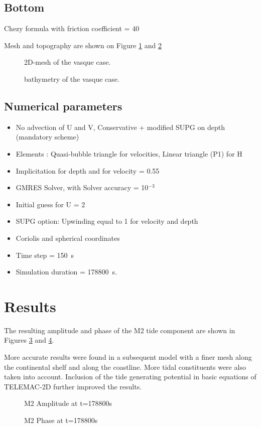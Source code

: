 \subsection{Bottom}
Chezy formula with friction coefficient = 40

Mesh and topography are shown on Figure \ref{fig:m2wave:Mesh} and \ref{fig:m2wave:Bathy}

\begin{figure}[H]
 \centering
  \caption{2D-mesh of the vasque case.}\label{fig:m2wave:Mesh}
\end{figure}
\begin{figure}[H]
 \centering
  \caption{bathymetry of the vasque case.}\label{fig:m2wave:Bathy}
\end{figure}

\subsection{Numerical parameters}
\begin{itemize}
\item No advection of U and V, Conservative + modified SUPG on depth (mandatory scheme)
\item Elements : Quasi-bubble triangle for velocities, Linear triangle (P1) for H
\item Implicitation for depth and for velocity = 0.55
\item GMRES Solver, with  Solver accuracy = 10$^{-3}$
\item  Initial guess for U = 2
\item  SUPG option: Upwinding equal to 1 for velocity and depth
\item Coriolis and spherical coordinates
\item Time step = 150~s
\item Simulation duration = 178800~s.
\end{itemize}

\section{Results}
The resulting amplitude and phase of the M2 tide component are shown in Figures \ref{fig:m2wave:Ampli} and \ref{fig:m2wave:Phase}. 

More accurate results were found in a subsequent model with a finer mesh along the
continental shelf and along the coastline. More tidal constituents were also taken
into account. Inclusion of the tide generating potential in basic equations of TELEMAC-2D
further improved the results.

\begin{figure}[H]
 \centering
  \caption{M2 Amplitude at t=178800s}\label{fig:m2wave:Ampli}
\end{figure}

\begin{figure}[H]
 \centering
  \caption{M2 Phase at t=178800s }\label{fig:m2wave:Phase}
\end{figure}
